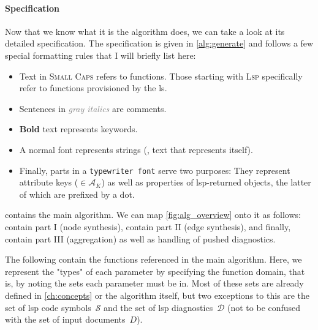 \documentclass[../thesis]{subfiles}
\begin{document}
\paragraph{Specification}
Now that we know what it is the algorithm does, we can take a look at its detailed specification.
The specification is given in \cref{alg:generate} and follows a few special formatting rules that I will briefly list here:
\begin{itemize}
	\item Text in \textsc{Small Caps} refers to functions.
	      Those starting with \textsc{Lsp} specifically refer to functions provisioned by the \gls{ls}.
	\item Sentences in \textit{\textcolor{gray}{gray italics}} are comments.
	\item \textbf{Bold} text represents keywords.
	\item A normal font represents strings (\ie, text that represents itself).
	\item Finally, parts in a \texttt{typewriter font} serve two purposes:
	      They represent attribute keys ($\in \mathcal{A}_K$) as well as properties of \gls{lsp}-returned objects, the latter of which are prefixed by a dot.
\end{itemize}

 contains the main algorithm.
We can map \cref{fig:alg_overview} onto it as follows:
 contain part I (node synthesis),
 contain part II (edge synthesis),
and finally,  contain part III (aggregation) as well as handling of pushed diagnostics.

The following  contain the functions referenced in the main algorithm.
Here, we represent the "types" of each parameter by specifying the function domain, that is, by noting the sets each parameter must be in.
Most of these sets are already defined in \cref{ch:concepts} or the algorithm itself, but two exceptions to this are the set of \gls{lsp} code symbols~$\mathcal{S}$ and the set of \gls{lsp} diagnostics~$\mathcal{D}$ (not to be confused with the set of input documents~$D$).


\end{document}
